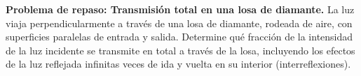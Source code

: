 \item \textbf{Problema de repaso: Transmisión total en una losa de diamante.}
La luz viaja perpendicularmente a través de una losa de diamante, rodeada de aire, con superficies paralelas de entrada y salida. Determine qué fracción de la intensidad de la luz incidente se transmite en total a través de la losa, incluyendo los efectos de la luz reflejada infinitas veces de ida y vuelta en su interior (interreflexiones).
